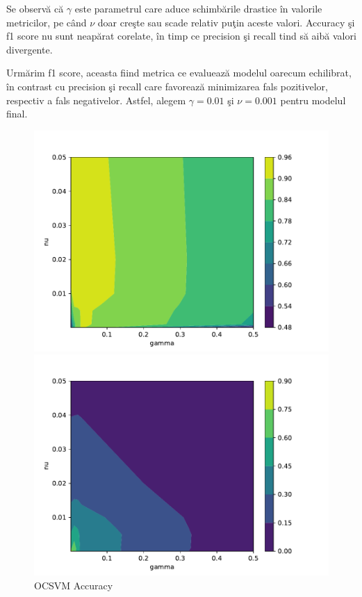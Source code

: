 Se observă că $\gamma$ este parametrul care aduce schimbările drastice în valorile 
metricilor, pe când $\nu$ doar creşte sau scade relativ puţin aceste valori. Accuracy şi f1 score 
nu sunt neapărat corelate, în timp ce precision şi recall tind să aibă valori 
divergente.

Urmărim f1 score, aceasta fiind metrica ce evaluează modelul oarecum 
echilibrat, în contrast cu precision şi recall care favorează minimizarea fals pozitivelor, 
respectiv a fals negativelor. Astfel, alegem $\gamma=0.01$ şi $\nu=0.001$ pentru modelul final.

\begin{figure}[p] %
    \begin{minipage}[t]{0.5\textwidth}
        \vspace{0pt}
        \includegraphics[width=\textwidth]{images/ocsvm-accuracy.pdf}
        \caption{OCSVM Accuracy}
    \end{minipage}
    \hfill
    \begin{minipage}[t]{0.5\textwidth}
        \vspace{0pt}
        \includegraphics[width=\textwidth]{images/ocsvm-precision.pdf}

\end{minipage}
\end{figure}
